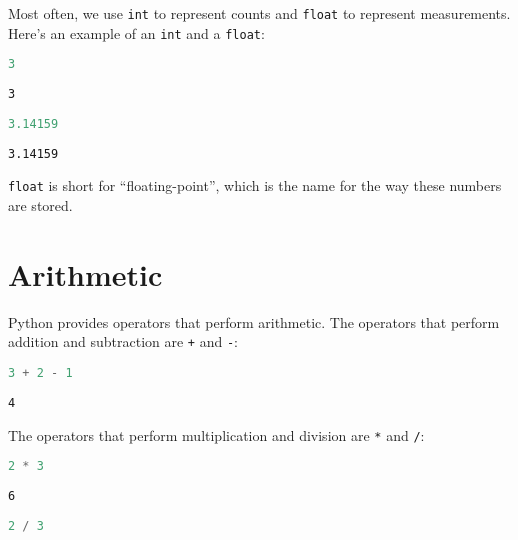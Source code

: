 Most often, we use \passthrough{\lstinline!int!} to represent counts and
\passthrough{\lstinline!float!} to represent measurements. Here's an
example of an \passthrough{\lstinline!int!} and a
\passthrough{\lstinline!float!}:

\begin{lstlisting}[language=Python,style=source]
3
\end{lstlisting}

\begin{lstlisting}[style=output]
3
\end{lstlisting}

\begin{lstlisting}[language=Python,style=source]
3.14159
\end{lstlisting}

\begin{lstlisting}[style=output]
3.14159
\end{lstlisting}

\passthrough{\lstinline!float!} is short for ``floating-point'', which
is the name for the way these numbers are stored.

\hypertarget{arithmetic}{%
\section{Arithmetic}\label{arithmetic}}

Python provides operators that perform arithmetic. The operators that
perform addition and subtraction are \passthrough{\lstinline!+!} and
\passthrough{\lstinline!-!}:

\begin{lstlisting}[language=Python,style=source]
3 + 2 - 1
\end{lstlisting}

\begin{lstlisting}[style=output]
4
\end{lstlisting}

The operators that perform multiplication and division are
\passthrough{\lstinline!*!} and \passthrough{\lstinline!/!}:

\begin{lstlisting}[language=Python,style=source]
2 * 3
\end{lstlisting}

\begin{lstlisting}[style=output]
6
\end{lstlisting}

\begin{lstlisting}[language=Python,style=source]
2 / 3
\end{lstlisting}

